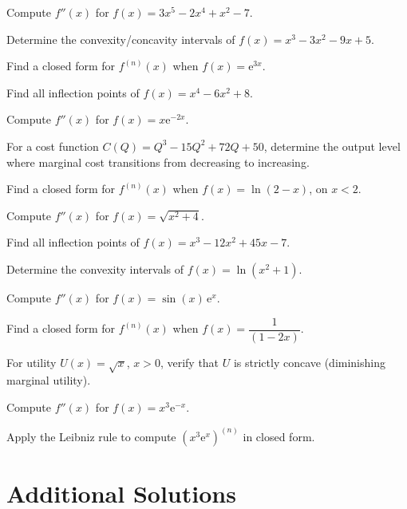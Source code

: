 \begin{problems}
  \item Compute $f''(x)$ for $f(x)=3x^{5}-2x^{4}+x^{2}-7$.
  \item Determine the convexity/concavity intervals of
        $f(x)=x^{3}-3x^{2}-9x+5$.
  \item Find a closed form for $f^{(n)}(x)$ when $f(x)=\mathrm{e}^{3x}$.
  \item Find all inflection points of $f(x)=x^{4}-6x^{2}+8$.
  \item Compute $f''(x)$ for $f(x)=x\mathrm{e}^{-2x}$.
  \item For a cost function $C(Q)=Q^{3}-15Q^{2}+72Q+50$, determine the
        output level where marginal cost transitions from decreasing to
        increasing.
  \item Find a closed form for $f^{(n)}(x)$ when $f(x)=\ln(2-x)$, on
        $x<2$.
  \item Compute $f''(x)$ for $f(x)=\sqrt{x^{2}+4}$.
  \item Find all inflection points of $f(x)=x^{3}-12x^{2}+45x-7$.
  \item Determine the convexity intervals of $f(x)=\ln(x^{2}+1)$.
  \item Compute $f''(x)$ for $f(x)=\sin(x)\,\mathrm{e}^{x}$.
  \item Find a closed form for $f^{(n)}(x)$ when
        $f(x)=\dfrac{1}{(1-2x)}$.
  \item For utility $U(x)=\sqrt{x}$, $x>0$, verify that $U$ is strictly
        concave (diminishing marginal utility).
  \item Compute $f''(x)$ for $f(x)=x^{3}\mathrm{e}^{-x}$.
  \item Apply the Leibniz rule to compute $(x^{3}\mathrm{e}^{x})^{(n)}$ in
        closed form.
\end{problems}

\section{Additional Solutions}

